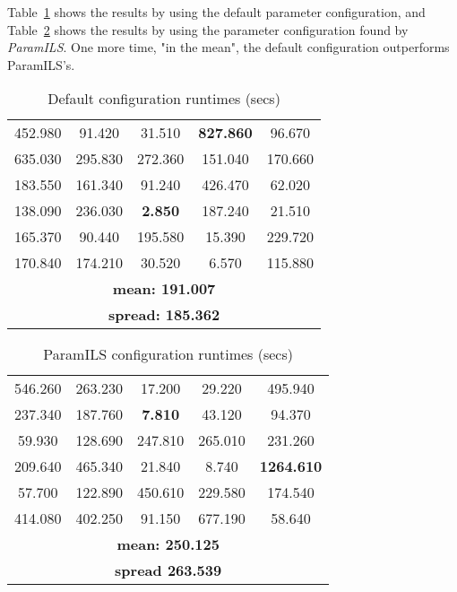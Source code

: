 Table~\ref{table:testcabad} shows the results by using the default parameter configuration, and Table~\ref{table:testcagood} shows the results by using the parameter configuration found by {\it ParamILS}. One more time, "in the mean", the default configuration outperforms {\sc ParamILS}'s.

\begin{table}[h]
\centering
\renewcommand{\arraystretch}{1.2}
\begin{tabular}{|ccccc|}
	\hline
	452.980 & 91.420 & 31.510 & \textcolor{intenso}{\bf 827.860} & 96.670 \\ 
	635.030 & 295.830 & 272.360 & 151.040 & 170.660 \\  
	\hline 
	183.550 & 161.340 & 91.240 & 426.470 & 62.020 \\ 
	138.090 & 236.030 & \textcolor{naranja}{\bf 2.850} & 187.240 & 21.510 \\  
	\hline 
	165.370 & 90.440 & 195.580 & 15.390 & 229.720 \\ 
	170.840 & 174.210 & 30.520 & 6.570 & 115.880 \\  
	\hline
	\multicolumn{5}{|c|}{\bf mean: 191.007}\\
	\multicolumn{5}{|c|}{\bf spread: 185.362}\\
	\hline
\end{tabular}
\caption{Default configuration runtimes (secs)}\label{table:testcabad}
\end{table}

\begin{table}[h]
\centering
\renewcommand{\arraystretch}{1.2}
\begin{tabular}{|ccccc|}
	\hline
	546.260 & 263.230 & 17.200 & 29.220 & 495.940 \\ 
	237.340 & 187.760 & \textcolor{naranja}{\bf 7.810} & 43.120 & 94.370 \\  
	\hline 
	59.930 & 128.690 & 247.810 & 265.010 & 231.260 \\ 
	209.640 & 465.340 & 21.840 & 8.740 & \textcolor{intenso}{\bf 1264.610} \\  
	\hline 
	57.700 & 122.890 & 450.610 & 229.580 & 174.540 \\ 
	414.080 & 402.250 & 91.150 & 677.190 & 58.640 \\  
	\hline 
	\multicolumn{5}{|c|}{\bf mean: 250.125}\\
	\multicolumn{5}{|c|}{\bf spread 263.539}\\
	\hline
\end{tabular}
\caption{ParamILS configuration runtimes (secs)}\label{table:testcagood}
\end{table}    

